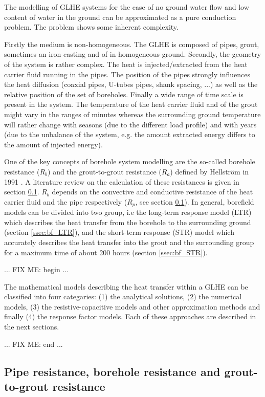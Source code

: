 \documentclass[a4paper,oneside,11pt]{report}
\begin{document}
The modelling of GLHE systems for the case of no ground water flow and low content of water in the ground can be approximated as a pure conduction problem. The problem shows some inherent complexity. 

Firstly the medium is non-homogeneous. The GLHE is composed of pipes, grout, sometimes an iron casting and of in-homogeneous ground. Secondly, the geometry of the system is rather complex. The heat is injected/extracted from the heat carrier fluid running in the pipes. The position of the pipes strongly influences the heat diffusion (coaxial pipes, U-tubes pipes, shank spacing, ...) as well as the relative position of the set of boreholes. Finally a wide range of time scale is present in the system. The temperature of the heat carrier fluid and of the grout might vary in the ranges of minutes whereas the surrounding ground temperature will rather change with seasons (due to the different load profile) and with years (due to the unbalance of the system, e.g. the amount extracted energy differs to the amount of injected energy).

One of the key concepts of borehole system modelling are the so-called borehole resistance ($R_b$) and the grout-to-grout resistance ($R_a$) defined by Hellstr\"om in 1991 \cite{hel91}. A literature review on the calculation of these resistances is given in section \ref{ssec:bf_R}. $R_b$ depends on the convective and conductive resistance of the heat carrier fluid and the pipe respectively ($R_p$, see section \ref{ssec:bf_R}). In general, borefield models can be divided into two group, i.e the long-term response model (LTR) which describes the heat transfer from the borehole to the surrounding ground (section \ref{ssec:bf_LTR}), and the short-term response (STR) model which accurately describes the heat transfer into the grout and the surrounding group for a maximum time of about 200 hours (section \ref{ssec:bf_STR}).

... FIX ME: begin ...

The mathematical models describing the heat transfer within a GLHE can be classified into four categaries: (1) the analytical solutions, (2) the numerical models, (3) the resistive-capacitive models and other approximation methods and finally (4) the response factor models. Each of these approaches are described in the next sections.

... FIX ME: end ...


\subsection{Pipe resistance, borehole resistance and grout-to-grout resistance} \label{ssec:bf_R}
\end{document}
